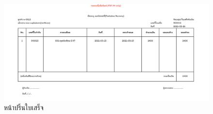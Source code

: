         \begin{figure}
          \begin{center}
          \includegraphics[width=\linewidth]{images/slipPage.png}
          \end{center}
          \caption[หน้าปริ้นใบเสร็จ]{หน้าปริ้นใบเสร็จ}
          \label{fig:slipPage}
          \end{figure}
